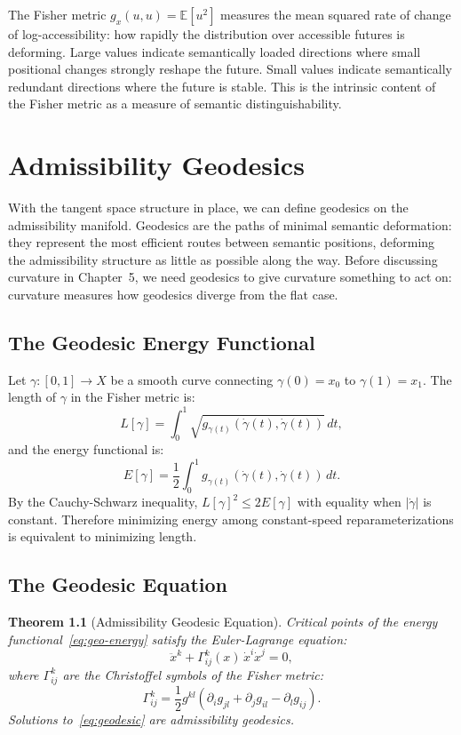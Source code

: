 \documentclass[12pt, oneside]{book}
\theoremstyle{plain-flyxion}
\newtheorem{theorem}{Theorem}[chapter]
\theoremstyle{definition-flyxion}
\begin{document}
The Fisher metric $g_x(u,u) = \mathbb{E}[u^2]$ measures the mean squared rate of change
of log-accessibility: how rapidly the distribution over accessible futures is deforming.
Large values indicate semantically loaded directions where small positional changes
strongly reshape the future. Small values indicate semantically redundant directions
where the future is stable. This is the intrinsic content of the Fisher metric as a
measure of semantic distinguishability.

\chapter{Admissibility Geodesics}

With the tangent space structure in place, we can define geodesics on the admissibility
manifold. Geodesics are the paths of minimal semantic deformation: they represent the
most efficient routes between semantic positions, deforming the admissibility structure
as little as possible along the way. Before discussing curvature in Chapter~5, we need
geodesics to give curvature something to act on: curvature measures how geodesics diverge
from the flat case.

\section{The Geodesic Energy Functional}

Let $\gamma: [0,1] \to X$ be a smooth curve connecting $\gamma(0) = x_0$ to $\gamma(1)
= x_1$. The length of $\gamma$ in the Fisher metric is:
\[
L[\gamma] = \int_0^1 \sqrt{g_{\gamma(t)}(\dot\gamma(t), \dot\gamma(t))}\, dt,
\]
and the energy functional is:
\begin{equation}\label{eq:geo-energy}
E[\gamma] = \frac{1}{2}\int_0^1 g_{\gamma(t)}(\dot\gamma(t), \dot\gamma(t))\, dt.
\end{equation}
By the Cauchy-Schwarz inequality, $L[\gamma]^2 \leq 2E[\gamma]$ with equality when
$|\dot\gamma|$ is constant. Therefore minimizing energy among constant-speed
reparameterizations is equivalent to minimizing length.

\section{The Geodesic Equation}

\begin{theorem}[Admissibility Geodesic Equation]\label{thm:geodesic}
Critical points of the energy functional~\eqref{eq:geo-energy} satisfy the
Euler-Lagrange equation:
\begin{equation}\label{eq:geodesic}
\ddot{x}^k + \Gamma^k_{ij}(x)\, \dot{x}^i \dot{x}^j = 0,
\end{equation}
where $\Gamma^k_{ij}$ are the Christoffel symbols of the Fisher metric:
\begin{equation}\label{eq:christoffel}
\Gamma^k_{ij} = \frac{1}{2} g^{kl}\!\left(\partial_i g_{jl} + \partial_j g_{il}
- \partial_l g_{ij}\right).
\end{equation}
Solutions to~\eqref{eq:geodesic} are \emph{admissibility geodesics}.
\end{theorem}
\end{document}
